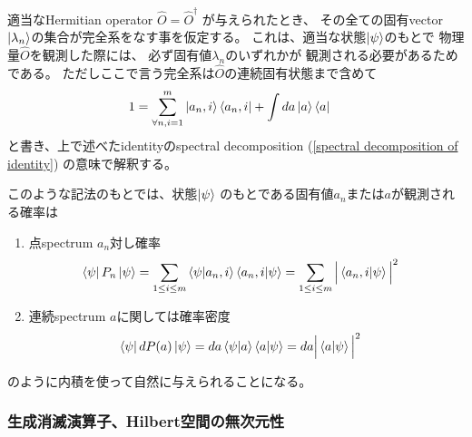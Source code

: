 適当なHermitian operator
$\hat{O} = \hat{O}^\dagger$
が与えられたとき、
その全ての固有vector
$\ket{\lambda_n}$の集合が完全系をなす事を仮定する。
これは、適当な状態$\ket{\psi}$のもとで
物理量$\hat{O}$を観測した際には、
必ず固有値$\lambda_n$のいずれかが
観測される必要があるためである。
ただしここで言う完全系は$\hat{O}$の連続固有状態まで含めて
\begin{align}
    1&=
    \sum_{\forall n,i=1}^m \ket{a_n,i}\bra{a_n,i}
    +
    \int da \ket{a}\bra{a}
\end{align}
と書き、上で述べたidentityのspectral decomposition
(\ref{spectral decomposition of identity})
の意味で解釈する。

このような記法のもとでは、状態$\ket{\psi}$
のもとである固有値$a_n$または$a$が観測される確率は
\begin{enumerate}
    \item{点spectrum $a_n$対し確率
    \begin{align}
        \bra{\psi} P_n \ket{\psi}
        &=
            \sum_{1\le i \le m}
        \braket{\psi | a_n,i}
        \braket{a_n,i | \psi}
        =
            \sum_{1\le i \le m}
            \Big|
                \braket{a_n,i | \psi}
            \Big|^2
    \end{align}
    }
    \item{連続spectrum $a$に関しては確率密度
    \begin{align}
        \bra{\psi} d P(a) \ket{\psi}
        &=
        da \braket{\psi | a}\braket{a | \psi}
    =
        da
            \Big|
                \braket{a | \psi}
            \Big|^2
    \end{align}
    }
\end{enumerate}
のように内積を使って自然に与えられることになる。

\subsubsection{生成消滅演算子、Hilbert空間の無次元性}

